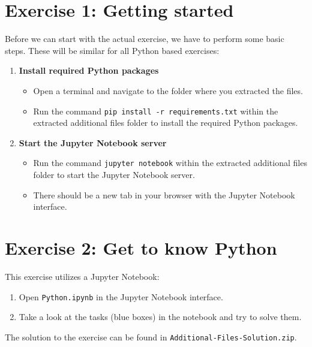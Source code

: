 \documentclass[
english,
smallborders
]{i6prcsht}
\begin{document}
\section*{Exercise 1: Getting started}

Before we can start with the actual exercise, we have to perform some basic steps. These will be similar for all Python based exercises:

\begin{enumerate}
	\item \textbf{Install required Python packages}

	      \begin{itemize}
		      \item Open a terminal and navigate to the folder where you extracted the files.
		      \item Run the command \texttt{pip install -r requirements.txt} within the extracted additional files
		            folder to install the required Python packages.
	      \end{itemize}

	\item \textbf{Start the Jupyter Notebook server}

	      \begin{itemize}
		      \item Run the command \texttt{jupyter notebook} within the extracted additional files
		            folder to start the Jupyter Notebook server.
		      \item There should be a new tab in your browser with the Jupyter Notebook interface.
	      \end{itemize}
\end{enumerate}

\section*{Exercise 2: Get to know Python}

This exercise utilizes a Jupyter Notebook:

\begin{enumerate}
	\item Open \texttt{Python.ipynb} in the Jupyter Notebook interface.
	\item Take a look at the tasks (blue boxes) in the notebook and try to solve them.
\end{enumerate}

\begin{solution}
	The solution to the exercise can be found in \texttt{Additional-Files-Solution.zip}.
\end{solution}
\end{document}
